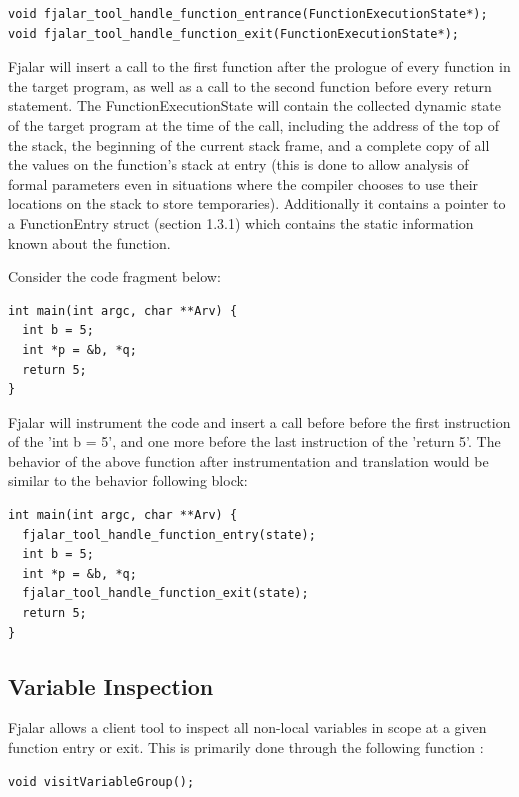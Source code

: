 \documentclass{article}
\begin{document}
\lstset{language=C, frame=none, basicstyle=\small}
\begin{lstlisting}
void fjalar_tool_handle_function_entrance(FunctionExecutionState*);
void fjalar_tool_handle_function_exit(FunctionExecutionState*);
\end{lstlisting}

Fjalar will insert a call to the first function after the
prologue of every function in the target program, as well as a
call to the second function before every return statement. The
FunctionExecutionState will contain the collected dynamic state of the
target program at the time of the call, including the address of the top of the stack, the
beginning of the current stack frame, and a complete copy of all the
values on the function's stack at entry (this is done to allow
analysis of formal parameters even in situations where the compiler
chooses to use their locations on the stack to store temporaries). 
Additionally it contains a pointer to a FunctionEntry struct (section
1.3.1) which contains the static information known about the function.

Consider the code fragment below:

\lstset{language=C, frame=single,basicstyle=\small}
\begin{lstlisting}
int main(int argc, char **Arv) {
  int b = 5;
  int *p = &b, *q;
  return 5;
}
\end{lstlisting}

Fjalar will instrument the code and insert a call before before the
first instruction of the 'int b = 5', and one more before the last
instruction of the 'return 5'. The behavior of the above function
after instrumentation and translation would be similar to the
behavior following block: 

\begin{lstlisting}
int main(int argc, char **Arv) {
  fjalar_tool_handle_function_entry(state);
  int b = 5;
  int *p = &b, *q;
  fjalar_tool_handle_function_exit(state);
  return 5;
}
\end{lstlisting}


\subsection{Variable Inspection}

Fjalar allows a client tool to inspect all non-local  variables in
scope at a given function entry or exit. This is primarily done
through the following function :

\lstset{language=C, frame=none, basicstyle=\small}
\begin{lstlisting}
void visitVariableGroup();
\end{lstlisting}
\end{document}
